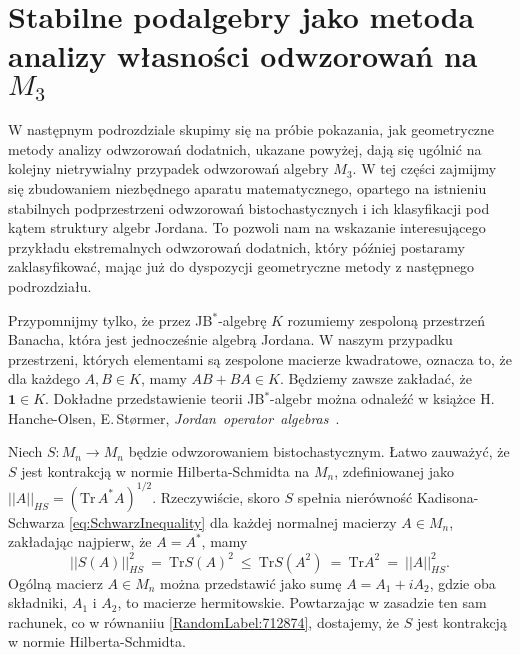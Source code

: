 \section{Stabilne podalgebry jako metoda analizy własności odwzorowań na $M_{3}$}
\label{sec:M3notes}

W następnym podrozdziale skupimy się na próbie pokazania,
jak geometryczne metody analizy odwzorowań dodatnich,
ukazane powyżej,
dają się ugólnić na kolejny nietrywialny przypadek odwzorowań algebry $M_{3}$.
W tej części zajmijmy się zbudowaniem niezbędnego aparatu matematycznego,
opartego na istnieniu stabilnych podprzestrzeni odwzorowań bistochastycznych
i ich klasyfikacji pod kątem struktury algebr Jordana.
To pozwoli nam na wskazanie interesującego przykładu ekstremalnych odwzorowań
dodatnich, który później postaramy zaklasyfikować, mając już do dyspozycji
geometryczne metody z następnego podrozdziału.

Przypomnijmy tylko, że przez JB$^{*}$-algebrę $K$ rozumiemy zespoloną
przestrzeń Banacha, która jest jednocześnie algebrą Jordana.
W naszym przypadku przestrzeni, których elementami są zespolone macierze
kwadratowe,
oznacza to, że dla każdego $A, B \in K$, mamy
$AB + BA \in K$.
Będziemy zawsze zakładać, że $\mathbf{1} \in K$.
Dokładne przedstawienie teorii JB$^{*}$-algebr można odnaleźć w książce
H.\,Hanche-Olsen, E.\,St{\o}rmer,
\mbox{\emph{Jordan operator algebras} \cite{Hanche1984}}.

\vspace{0.5cm}
Niech $S\!: M_{n} \rightarrow M_{n}$ będzie odwzorowaniem bistochastycznym.
Łatwo zauważyć, że $S$ jest kontrakcją w normie Hilberta-Schmidta
na $M_{n}$, zdefiniowanej jako
$||A||_{HS} = \left( \text{Tr} \, A^{*} A \right)^{1/2}$.
Rzeczywiście, skoro $S$ spełnia nierówność Kadisona-Schwarza
\eqref{eq:SchwarzInequality}
dla każdej normalnej macierzy $A \in M_{n}$,
zakładając najpierw, że $A = A^{*}$,
mamy
\begin{equation}
\label{RandomLabel:712874}
    || S(A) ||_{HS}^{2} \: = \: \text{Tr} S(A)^{2}
    \: \leq \:  \text{Tr} S(A^{2}) \: = \:
        \text{Tr} A^{2} \: = \: ||A||_{HS}^{2}.
\end{equation}
Ogólną macierz $A \in M_{n}$ można przedstawić jako sumę
$A = A_{1} + i A_{2}$,
gdzie oba składniki, $A_{1}$ i $A_{2}$, to macierze hermitowskie.
Powtarzając w zasadzie ten sam rachunek, co w równaniiu
\eqref{RandomLabel:712874},
dostajemy, że $S$ jest kontrakcją w normie Hilberta-Schmidta.

